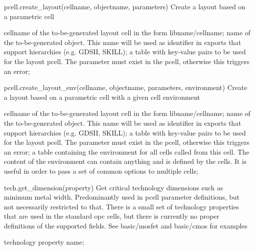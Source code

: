 \begin{APIfunc}{pcell.create\_layout(cellname, objectname, parameters)}
    Create a layout based on a parametric cell
    \begin{APIparameters}
            cellname of the to-be-generated layout cell in the form libname/cellname;
            name of the to-be-generated object. This name will be used as identifier in exports that support hierarchies (e.g. GDSII, SKILL);
            a table with key-value pairs to be used for the layout pcell. The parameter must exist in the pcell, otherwise this triggers an error;
    \end{APIparameters}
\end{APIfunc}
\begin{APIfunc}{pcell.create\_layout\_env(cellname, objectname, parameters, environment)}
    Create a layout based on a parametric cell with a given cell environment
    \begin{APIparameters}
            cellname of the to-be-generated layout cell in the form libname/cellname;
            name of the to-be-generated object. This name will be used as identifier in exports that support hierarchies (e.g. GDSII, SKILL);
            a table with key-value pairs to be used for the layout pcell. The parameter must exist in the pcell, otherwise this triggers an error;
            a table containing the environment for all cells called from this cell. The content of the environment can contain anything and is defined by the cells. It is useful in order to pass a set of common options to multiple cells;
    \end{APIparameters}
\end{APIfunc}
\begin{APIfunc}{tech.get\_dimension(property)}
    Get critical technology dimensions such as minimum metal width. Predominantly used in pcell parameter definitions, but not necessarily restricted to that. There is a small set of technology properties that are used in the standard opc cells, but there is currently no proper definitions of the supported fields. See basic/mosfet and basic/cmos for examples
    \begin{APIparameters}
            technology property name;
    \end{APIparameters}
\end{APIfunc}
